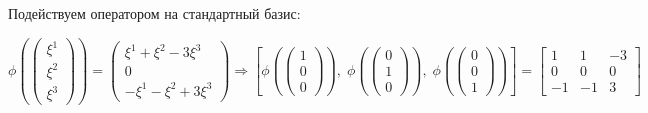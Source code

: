 \documentclass{article}
\begin{document}
\begin{center}
Подействуем оператором на стандартный базис:
\end{center}
\noindent$$\phi(\left(\begin{array}{c}\xi^1 \\ \xi^2 \\ \xi^3\end{array}\right)) = \left(\begin{array}{c}\xi^1 + \xi^2 - 3\xi^3 \\ 0 \\ -\xi^1-\xi^2+3\xi^3\end{array}\right) \Rightarrow
\left[\phi(\left(\begin{array}{c}1 \\ 0 \\ 0\end{array}\right)),\; \phi(\left(\begin{array}{c}0 \\ 1 \\ 0\end{array}\right)),\; \phi(\left(\begin{array}{c}0 \\ 0 \\ 1\end{array}\right))\right] =
\left[\begin{array}{rrr}
1 & 1 & -3 \\ 0 & 0 & 0 \\ -1 & -1 & 3
\end{array}\right]$$
\end{document}
